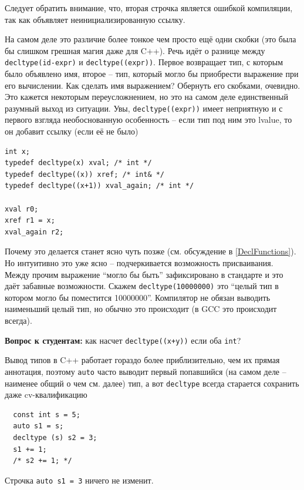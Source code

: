 \documentclass[a4paper,12pt,oneside]{article}
\newif\ifanswers
\begin{document}
Следует обратить внимание, что, вторая строчка является ошибкой компиляции, так как объявляет неинициализированную ссылку.

На самом деле это различие более тонкое чем просто ещё одни скобки (это была бы слишком грешная магия даже для C++). Речь идёт о разнице между \lstinline!decltype(id-expr)! и \lstinline!decltype((expr))!. Первое возвращает тип, с которым было объявлено имя, второе -- тип, который могло бы приобрести выражение при его вычислении. Как сделать имя выражением? Обернуть его скобками, очевидно. Это кажется некоторым переусложнением, но это на самом деле единственный разумный выход из ситуации. Увы, \lstinline!decltype((expr))! имеет неприятную и с первого взгляда необоснованную особенность -- если тип под ним это lvalue, то он добавит ссылку (если её не было)

\begin{lstlisting}
int x;
typedef decltype(x) xval; /* int */
typedef decltype((x)) xref; /* int& */
typedef decltype((x+1)) xval_again; /* int */

xval r0;
xref r1 = x;
xval_again r2;
\end{lstlisting}

Почему это делается станет ясно чуть позже (см. обсуждение в \ref{DeclFunctions}). Но интуитивно это уже ясно -- подчеркивается возможность присваивания. Между прочим выражение ``могло бы быть'' зафиксировано в стандарте и это даёт забавные возможности. Скажем \lstinline!decltype(10000000)! это ``целый тип в котором могло бы поместится 10000000''. Компилятор не обязан выводить наименьший целый тип, но обычно это происходит (в GCC это происходит всегда).

\textbf{Вопрос к студентам:} как насчет \lstinline!decltype((x+y))! если оба \lstinline!int!?

\ifanswers
Правильный ответ: конечно же сумма это не lvalue.
\fi

Вывод типов в C++ работает гораздо более приблизительно, чем их прямая аннотация, поэтому \lstinline!auto! часто выводит первый попавшийся (на самом деле -- наименее общий о чем см. далее) тип, а вот \lstinline!decltype! всегда старается сохранить даже cv-квалификацию

\begin{lstlisting}
  const int s = 5;
  auto s1 = s;
  decltype (s) s2 = 3;
  s1 += 1;
  /* s2 += 1; */
\end{lstlisting}

Строчка \lstinline!auto s1 = 3! ничего не изменит.
\end{document}
